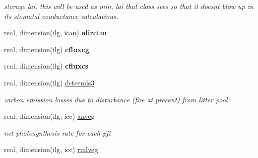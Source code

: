 \begin{DoxyCompactItemize}
\begin{DoxyCompactList}\small\item\em storage lai. this will be used as min. lai that class sees so that it doesn\textquotesingle{}t blow up in its stomatal conductance calculations. \end{DoxyCompactList}\item 
\hypertarget{structctem__statevars_1_1veg__gat_a86ea8eeea5c36a73bd27ce073705ae74}{}real, dimension(ilg, ican) {\bfseries alirctm}\label{structctem__statevars_1_1veg__gat_a86ea8eeea5c36a73bd27ce073705ae74}

\item 
\hypertarget{structctem__statevars_1_1veg__gat_aeef6566e82218dd656f1b074d62a82a9}{}real, dimension(ilg) {\bfseries cfluxcg}\label{structctem__statevars_1_1veg__gat_aeef6566e82218dd656f1b074d62a82a9}

\item 
\hypertarget{structctem__statevars_1_1veg__gat_a68c0b004a69e8a69dfcd9efc6ded0cdd}{}real, dimension(ilg) {\bfseries cfluxcs}\label{structctem__statevars_1_1veg__gat_a68c0b004a69e8a69dfcd9efc6ded0cdd}

\item 
\hypertarget{structctem__statevars_1_1veg__gat_ab34a60d0d1e3b3b0c76af0cb61d331ab}{}real, dimension(ilg) \hyperlink{structctem__statevars_1_1veg__gat_ab34a60d0d1e3b3b0c76af0cb61d331ab}{dstcemls3}\label{structctem__statevars_1_1veg__gat_ab34a60d0d1e3b3b0c76af0cb61d331ab}

\begin{DoxyCompactList}\small\item\em carbon emission losses due to disturbance (fire at present) from litter pool \end{DoxyCompactList}\item 
\hypertarget{structctem__statevars_1_1veg__gat_a7764723050312189f092c5783d86653e}{}real, dimension(ilg, icc) \hyperlink{structctem__statevars_1_1veg__gat_a7764723050312189f092c5783d86653e}{anveg}\label{structctem__statevars_1_1veg__gat_a7764723050312189f092c5783d86653e}

\begin{DoxyCompactList}\small\item\em net photosynthesis rate for each pft \end{DoxyCompactList}\item 
\hypertarget{structctem__statevars_1_1veg__gat_ae0cc8f257424a7fea8d06048f1bcbf4f}{}real, dimension(ilg, icc) \hyperlink{structctem__statevars_1_1veg__gat_ae0cc8f257424a7fea8d06048f1bcbf4f}{rmlveg}\label{structctem__statevars_1_1veg__gat_ae0cc8f257424a7fea8d06048f1bcbf4f}


\end{DoxyCompactItemize}
